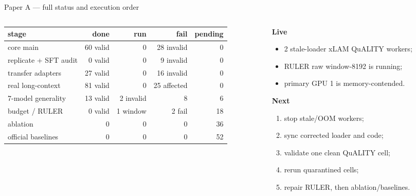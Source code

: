 \begin{frame}{Paper A --- full status and execution order}
  \begin{columns}[T]
  \begin{column}{0.56\textwidth}
    \centering\scriptsize
    \begin{tabular}{lrrrr}
    \toprule
    stage & done & run & fail & pending \\
    \midrule
    core main & 60 valid & 0 & 28 invalid & 0 \\
    replicate + SFT audit & 0 valid & 0 & 9 invalid & 0 \\
    transfer adapters & 27 valid & 0 & 16 invalid & 0 \\
    real long-context & 81 valid & 0 & 25 affected & 0 \\
    7-model generality & 13 valid & 2 invalid & 8 & 6 \\
    budget / RULER & 0 valid & 1 window & 2 fail & 18 \\
    ablation & 0 & 0 & 0 & 36 \\
    official baselines & 0 & 0 & 0 & 52 \\
    \bottomrule
    \end{tabular}
  \end{column}
  \begin{column}{0.44\textwidth}
    \textbf{Live}
    \begin{itemize}\scriptsize
      \item 2 stale-loader xLAM QuALITY workers;
      \item RULER raw window-8192 is running;
      \item primary GPU 1 is memory-contended.
    \end{itemize}
    \textbf{Next}
    \begin{enumerate}\scriptsize
      \item stop stale/OOM workers;
      \item sync corrected loader and code;
      \item validate one clean QuALITY cell;
      \item rerun quarantined cells;
      \item repair RULER, then ablation/baselines.
    \end{enumerate}
  \end{column}
  \end{columns}
  \vspace{0.4em}
  \centering\footnotesize
  \quad
\end{frame}
